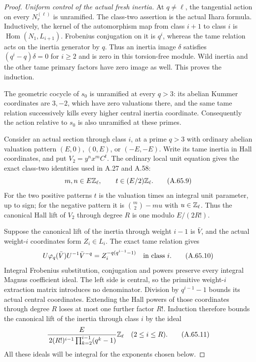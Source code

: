 \begin{proof}
\emph{Uniform control of the actual fresh inertia.}
At $q\ne\ell$, the tangential action on every $N_r^{(\ell)}$ is
unramified.  The class-two assertion is the actual Ihara formula.
Inductively, the kernel of the automorphism map from class $i+1$
to class $i$ is
$\operatorname{Hom}(N_1,L_{i+1})$.
Frobenius conjugation on it is $q^i$, whereas the tame relation acts
on the inertia generator by $q$.  Thus an inertia image $\delta$
satisfies $(q^i-q)\delta=0$ for $i\geq2$ and is zero in this
torsion-free module.  Wild inertia and the other tame primary factors
have zero image as well.  This proves the induction.

The geometric cocycle of $s_0$ is unramified at every $q>3$:
its abelian Kummer coordinates are $3,-2$, which have zero valuations
there, and the same tame relation successively kills every higher
central inertia coordinate.  Consequently the action relative to
$s_0$ is also unramified at these primes.

Consider an actual section through class $i$, at a prime $q>3$ with
ordinary abelian valuation pattern $(E,0)$, $(0,E)$, or $(-E,-E)$.
Write its tame inertia in Hall coordinates, and put
$V_2=y^n x^m C^t$.  The ordinary local unit equation gives the exact
class-two identities used in A.27 and A.58:
\[
       m,n\in E\mathbb Z_\ell,\qquad
       t\in(E/2)\mathbb Z_\ell .
 \tag{A.65.9}
\]
For the two positive patterns $t$ is the valuation times an integral
unit parameter, up to sign; for the negative pattern it is
$\binom m2-mu$ with $u\in\mathbb Z_\ell$.
Thus the canonical Hall lift of $V_2$ through degree $R$ is one modulo
$E/(2R!)$.

Suppose the canonical lift of the inertia through weight $i-1$ is
$\bar V$, and the actual weight-$i$ coordinates form $Z_i\in L_i$.
The exact tame relation gives
\[
 U\varphi_q(\bar V)U^{-1}\bar V^{-q}
                    =Z_i^{-q(q^{i-1}-1)}
                         \quad\hbox{in class }i.
 \tag{A.65.10}
\]
Integral Frobenius substitution, conjugation and powers preserve every
integral Magnus coefficient ideal.  The left side is central, so the
primitive weight-$i$ extraction matrix introduces no denominator.
Division by $q^{i-1}-1$ bounds its actual central coordinates.
Extending the Hall powers of those coordinates through degree $R$
loses at most one further factor $R!$.  Induction therefore bounds the
canonical lift of the inertia through class $i$ by the ideal
\[
 \frac{E}{\,2(R!)^{i-1}\prod_{k=2}^{i-1}(q^k-1)}\mathbb Z_\ell
                         \quad(2\leq i\leq R).
 \tag{A.65.11}
\]
All these ideals will be integral for the exponents chosen below.


\end{proof}
